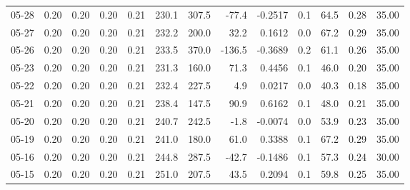 \begin{threeparttable}
{\begin{tabular}{lrrrrrrrrrrrr}
  05-28 &          0.20 &          0.20 &          0.20 &        0.21 &               230.1 &               307.5 &      -77.4 &      -0.2517 &                 0.1 &             64.5 &            0.28 &                  35.00 \\
  05-27 &          0.20 &          0.20 &          0.20 &        0.21 &               232.2 &               200.0 &       32.2 &       0.1612 &                 0.0 &             67.2 &            0.29 &                  35.00 \\
  05-26 &          0.20 &          0.20 &          0.20 &        0.21 &               233.5 &               370.0 &     -136.5 &      -0.3689 &                 0.2 &             61.1 &            0.26 &                  35.00 \\
  05-23 &          0.20 &          0.20 &          0.20 &        0.21 &               231.3 &               160.0 &       71.3 &       0.4456 &                 0.1 &             46.0 &            0.20 &                  35.00 \\
  05-22 &          0.20 &          0.20 &          0.20 &        0.21 &               232.4 &               227.5 &        4.9 &       0.0217 &                 0.0 &             40.3 &            0.18 &                  35.00 \\
  05-21 &          0.20 &          0.20 &          0.20 &        0.21 &               238.4 &               147.5 &       90.9 &       0.6162 &                 0.1 &             48.0 &            0.21 &                  35.00 \\
  05-20 &          0.20 &          0.20 &          0.20 &        0.21 &               240.7 &               242.5 &       -1.8 &      -0.0074 &                 0.0 &             53.9 &            0.23 &                  35.00 \\
  05-19 &          0.20 &          0.20 &          0.20 &        0.21 &               241.0 &               180.0 &       61.0 &       0.3388 &                 0.1 &             67.2 &            0.29 &                  35.00 \\
  05-16 &          0.20 &          0.20 &          0.20 &        0.21 &               244.8 &               287.5 &      -42.7 &      -0.1486 &                 0.1 &             57.3 &            0.24 &                  30.00 \\
  05-15 &          0.20 &          0.20 &          0.20 &        0.21 &               251.0 &               207.5 &       43.5 &       0.2094 &                 0.1 &             59.8 &            0.25 &                  35.00 \\

\end{tabular}}
\end{threeparttable}
